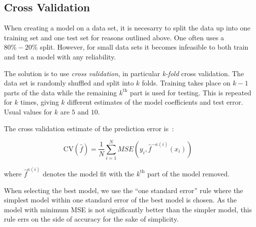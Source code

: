 \subsection{Cross Validation}
\label{sec:cv}

When creating a model on a data set, it is necesarry to split the data up
into one training set and one test set for reasons outlined above. One often
uses a \(80\% - 20\%\) split. However, for small data sets it becomes infeasible
to both train and test a model with any reliability.

The solution is to use \textit{cross validation}, in particular \textit{k-fold}
cross validation. The data set is randomly shuffled and split into \(k\) folds.
Training takes place on \(k-1\) parts of the data while the remaining
\(k^{\text{th}}\) part is used for testing. This is repeated for \(k\) times,
giving \(k\) different estimates of the model coefficients and test error.
Usual values for \(k\) are \(5\) and \(10\).

The cross validation estimate of the prediction error is~\cite{statelem}:

\begin{equation*}
  \text{CV}(\hat f) = \frac{1}{N}\sum_{i=1}^{N}MSE(y_{i}, \hat f^{-\kappa(i)}(x_{i}))
\end{equation*}

where \(\hat f^{\kappa(i)}\) denotes the model fit with the \(k^{\text{th}}\)
part of the model removed.


When selecting the best model, we use the ``one standard error'' rule where the
simplest model within one standard error of the best model is chosen. As the
model with minimum MSE is not significantly better than the simpler model, this rule
errs on the side of accuracy for the sake of simplicity. 

